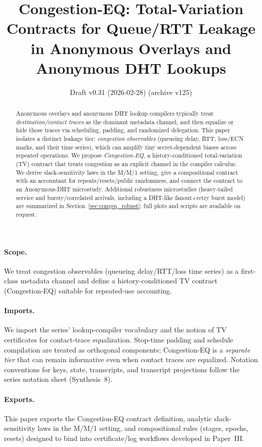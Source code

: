 \documentclass[11pt]{article}
\title{Congestion-EQ: Total-Variation Contracts for Queue/RTT Leakage \\ in Anonymous Overlays and Anonymous DHT Lookups}
\author{}
\date{Draft v0.31 (2026-02-28) (archive v125)}
\theoremstyle{definition}
\theoremstyle{remark}
\begin{document}
\maketitle

\begin{abstract}
Anonymous overlays and anonymous DHT lookup compilers typically treat \emph{destination/contact traces} as the dominant metadata channel, and then equalize or hide those traces via scheduling, padding, and randomized delegation.
This paper isolates a distinct leakage tier: \emph{congestion observables} (queueing delay, RTT, loss/ECN marks, and their time series), which can amplify tiny secret-dependent biases across repeated operations.
We propose \emph{Congestion-EQ}, a history-conditioned total-variation (TV) contract that treats congestion as an explicit channel in the compiler calculus.
We derive slack-sensitivity laws in the M/M/1 setting, give a compositional contract with an accountant for repeats/resets/public randomness, and connect the contract to an Anonymous-DHT microstudy.
Additional robustness microstudies (heavy-tailed service and bursty/correlated arrivals, including a DHT-like fanout+retry burst model) are summarized in Section~\ref{sec:congeq_robust}; full plots and scripts are available on request.
\end{abstract}
\paragraph{Scope.}
We treat congestion observables (queueing delay/RTT/loss time series) as a first-class metadata channel and define a history-conditioned TV contract (Congestion-EQ) suitable for repeated-use accounting.

\paragraph{Imports.}
We import the series' lookup-compiler vocabulary and the notion of TV certificates for contact-trace equalization.\cite{series:schedcompiler,series:knapsacktransport}
Stop-time padding and schedule compilation are treated as orthogonal components; Congestion-EQ is a \emph{separate tier} that can remain informative even when contact traces are equalized.
Notation conventions for keys, state, transcripts, and transcript projections follow the series notation sheet (Synthesis~8).\cite{series:notation}


\paragraph{Exports.}
This paper exports the Congestion-EQ contract definition, analytic slack-sensitivity laws in the M/M/1 setting, and compositional rules (stages, epochs, resets) designed to bind into certificate/log workflows developed in Paper~III.\cite{series:wcongeq}
\end{document}
